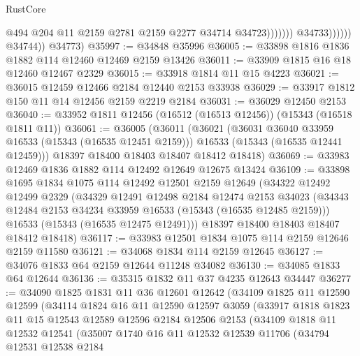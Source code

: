 \begin{lexlean}{RustCore}
\begin{coremodule}
                                    @494
                                    @204
                                    @11
                                    @2159
                                    @2781
                                    @2159
                                    @2277
                                    @34714
                                    @34723)))))))
                      @34733))))))
          @34744))
      @34773)
@35997 := @34848 @35996
@36005 := @33898 @1816 @1836 @1882 @114 @12460 @12469 @2159 @13426
@36011 := @33909 @1815 @16 @18 @12460 @12467 @2329
@36015 := @33918 @1814 @11 @15 @4223
@36021 := @36015 @12459 @12466 @2184 @12440 @2153 @33938
@36029 := @33917 @1812 @150 @11 @14 @12456 @2159 @2219 @2184
@36031 := @36029 @12450 @2153
@36040 := @33952 @1811 @12456 (@16512 (@16513 @12456)) (@15343 (@16518 @1811 @11))
@36061 := @36005
    (@36011
      (@36021
        (@36031 @36040 @33959 @16533 (@15343 (@16535 @12451 @2159)))
        @16533
        (@15343 (@16535 @12441 @12459)))
      @18397
      @18400
      @18403
      @18407
      @18412
      @18418)
@36069 := @33983 @12469 @1836 @1882 @114 @12492 @12649 @12675 @13424
@36109 := @33898
    @1695
    @1834
    @1075
    @114
    @12492
    @12501
    @2159
    @12649
    (@34322
      @12492
      @12499
      @2329
      (@34329
        @12491
        @12498
        @2184
        @12474
        @2153
        @34023
        (@34343 @12484 @2153 @34234 @33959 @16533 (@15343 (@16535 @12485 @2159)))
        @16533
        (@15343 (@16535 @12475 @12491)))
      @18397
      @18400
      @18403
      @18407
      @18412
      @18418)
@36117 := @33983 @12501 @1834 @1075 @114 @2159 @12646 @2159 @11580
@36121 := @34068 @1834 @114 @2159 @12645
@36127 := @34076 @1833 @64 @2159 @12644 @11248 @34082
@36130 := @34085 @1833 @64 @12644
@36136 := @35315 @1832 @11 @37 @4235 @12643 @34447
@36277 := @34090
    @1825
    @1831
    @11
    @36
    @12601
    @12642
    (@34109
      @1825
      @11
      @12590
      @12599
      (@34114
        @1824
        @16
        @11
        @12590
        @12597
        @3059
        (@33917
          @1818
          @1823
          @11
          @15
          @12543
          @12589
          @12596
          @2184
          @12506
          @2153
          (@34109
            @1818
            @11
            @12532
            @12541
            (@35007
              @1740
              @16
              @11
              @12532
              @12539
              @11706
              (@34794
                @12531
                @12538
                @2184

\end{coremodule}
\end{lexlean}
